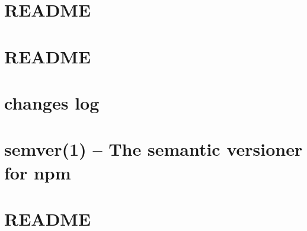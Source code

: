 \documentclass[twoside]{book}
\newcommand{\+}{\discretionary{\mbox{\scriptsize$\hookleftarrow$}}{}{}}
\begin{document}
\chapter{README}
\label{md__c___users_vaishnavi_jadhav__desktop__developer_code_mean_stack_example_client_node_modules_c620fcdcc8fe381fec0828ef63968a346}

\chapter{README}
\label{md__c___users_vaishnavi_jadhav__desktop__developer_code_mean_stack_example_client_node_modules_copy_webpack_plugin__r_e_a_d_m_e}

\chapter{changes log}
\label{md__c___users_vaishnavi_jadhav__desktop__developer_code_mean_stack_example_client_node_modules_c7bf1733bc441bb08fc9d74f4c2662610}

\chapter{semver(1) -- The semantic versioner for npm}
\label{md__c___users_vaishnavi_jadhav__desktop__developer_code_mean_stack_example_client_node_modules_cf0301bfbc527e4149deb2ffe065d9d33}

\chapter{README}
\label{md__c___users_vaishnavi_jadhav__desktop__developer_code_mean_stack_example_client_node_modules_core_js_compat__r_e_a_d_m_e}

\end{document}
